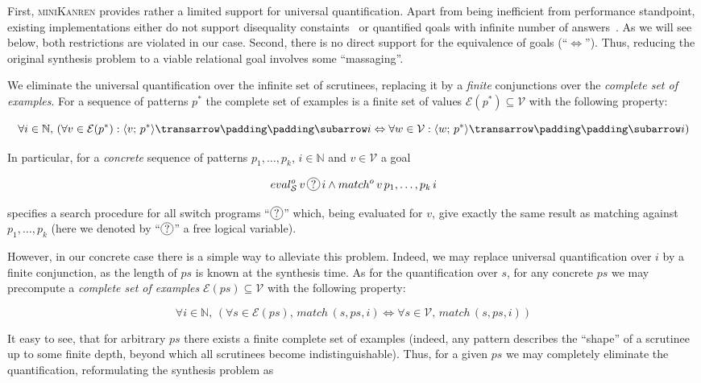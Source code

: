 First, \textsc{miniKanren} provides rather a limited support for universal quantification. Apart from being inefficient from
performance standpoint, existing implementations either do not support disequality constaints~\cite{eigen}
or quantified qoals with infinite number of answers~\cite{moiseenko}. As we will see below, both restrictions are
violated in our case. Second, there is no direct support for the equivalence of goals (``$\Leftrightarrow$''). Thus,
reducing the original synthesis problem to a viable relational goal involves some ``massaging''.

We eliminate the universal quantification over the infinite set of scrutinees, replacing it by a \emph{finite}
conjunctions over the \emph{complete set of examples}. For a sequence of patterns $p^*$ the
complete set of examples is a finite set of values $\mathcal{E}(p^*)\subseteq\mathcal{V}$ with the following
property:

\[
\forall i\in\mathbb{N},\,(\forall v\in\mathcal{E}(p^*) : \trans{\inbr{v;\,p^*}}{}{i} \Leftrightarrow \forall w\in\mathcal{V}:\trans{\inbr{w;\,p^*}}{}{i})
\]


In particular, for a \emph{concrete} sequence of patterns $p_1,\dots,p_k$, $i\in\mathbb N$ and $v\in\mathcal V$
a goal

\[
  eval^o_\ir\,v\,\circled{?}\,i \wedge match^o\,v\,p_1,\dots,p_k\,i
\]

specifies a search procedure for all switch programs ``$\circled{?}$'' which, being evaluated for $v$, give exactly the same result
as matching against $p_1,\dots,p_k$ (here we denoted by ``$\circled{?}$'' a free logical variable).

 
However, in our concrete
 case there is a simple way to alleviate this problem. Indeed, we may replace universal quantification over $i$ by
 a finite conjunction, as the length of $ps$ is known at the synthesis time. As for the quantification over $s$, for
 any concrete $ps$ we may precompute a \emph{complete set of examples} $\mathcal{E}(ps)\subseteq\mathcal{V}$ with the following
 property:
 
 \[
 \forall i\in\mathbb{N},\,(\forall s\in\mathcal{E}(ps),\,match\, (s, ps, i) \Leftrightarrow \forall s\in\mathcal{V},\,match\, (s, ps, i))
 \]
 
 It easy to see, that for arbitrary $ps$ there exists a finite complete set of examples (indeed, any pattern describes the ``shape''
 of a scrutinee up to some finite depth, beyond which all scrutinees become indistinguishable). Thus, for a given $ps$ we may
 completely eliminate the quantification, reformulating the synthesis problem as
 
